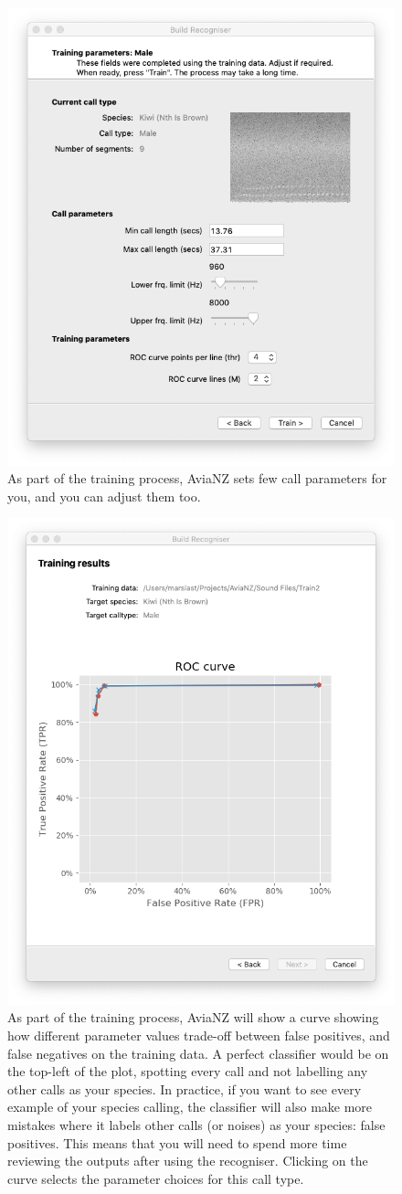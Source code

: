 \documentclass{article}
\begin{document}
       \begin{figure}[h]
    \centering
    \includegraphics[width=.4\textwidth]{Figs/Wizard_params}
    \caption{As part of the training process, AviaNZ sets few call parameters for you, and you can adjust them too.}
    \label{fig:filterparams}
    \end{figure}

        \begin{figure}[h]
    \centering
    \includegraphics[width=.4\textwidth]{Figs/Wizard_ROC}
    \caption{As part of the training process, AviaNZ will show a curve showing how different parameter values trade-off between false positives, and false negatives on the training data. A perfect classifier would be on the top-left of the plot, spotting every call and not labelling any other calls as your species. In practice, if you want to see every example of your species calling, the classifier will also make more mistakes where it labels other calls (or noises) as your species: false positives. This means that you will need to spend more time reviewing the outputs after using the recogniser. Clicking on the curve selects the parameter choices for this call type.}
    \label{fig:ROC}
    \end{figure}
    
\end{document}
